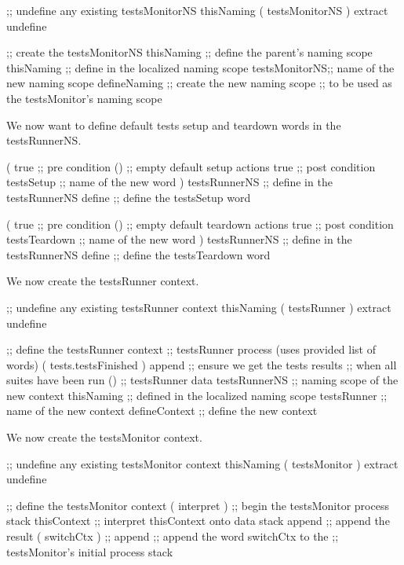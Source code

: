 \startJoylolCode
    ;; undefine any existing testsMonitorNS
    thisNaming
    ( testsMonitorNS ) extract
    undefine
  
    ;; create the testsMonitorNS
    thisNaming    ;; define the parent's naming scope
    thisNaming    ;; define in the localized naming scope
    testsMonitorNS;; name of the new naming scope
    defineNaming  ;; create the new naming scope
                  ;; to be used as the testsMonitor's naming scope
\stopJoylolCode

We now want to define default tests setup and teardown words in the 
testsRunnerNS. 

\startJoylolCode
    (
      { true }    ;; pre condition
      ()          ;; empty default setup actions
      { true }    ;; post condition
      testsSetup  ;; name of the new word
    ) 
    testsRunnerNS ;; define in the testsRunnerNS
    define        ;; define the testsSetup word
\stopJoylolCode

\startJoylolCode
    (
      { true }    ;; pre condition
      ()          ;; empty default teardown actions
      { true }    ;; post condition
      testsTeardown ;; name of the new word
    ) 
    testsRunnerNS ;; define in the testsRunnerNS
    define        ;; define the testsTeardown word
\stopJoylolCode

We now create the testsRunner context.

\startJoylolCode
    ;; undefine any existing testsRunner context
    thisNaming
    ( testsRunner ) extract
    undefine

    ;; define the testsRunner context
                  ;; testsRunner process (uses provided list of words)
    ( tests.testsFinished )
    append        ;; ensure we get the tests results
                  ;; when all suites have been run
    ()            ;; testsRunner data
    testsRunnerNS ;; naming scope of the new context
    thisNaming    ;; defined in the localized naming scope
    testsRunner   ;; name of the new context
    defineContext ;; define the new context
\stopJoylolCode

We now create the testsMonitor context.

\startJoylolCode
    ;; undefine any existing testsMonitor context
    thisNaming
    ( testsMonitor ) extract
    undefine

    ;; define the testsMonitor context
    ( interpret )   ;; begin the testsMonitor process stack
    thisContext     ;; interpret thisContext onto data stack
    append          ;; append the result
    ( switchCtx )   ;;
    append          ;; append the word switchCtx to the
                    ;; testsMonitor's initial process stack
  
